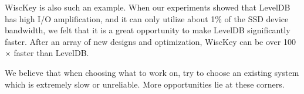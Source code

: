 WiscKey is also such an example. When our experiments showed that LevelDB
has high I/O amplification, and it can only utilize about 1\% of the
SSD device bandwidth, we felt that it is a great opportunity to make
LevelDB significantly faster. After an array of new designs and
optimization, WiscKey can be over 100$\times$ faster than LevelDB.    

We believe that when choosing what to work on, try to choose an
existing system which is extremely slow or unreliable. More
opportunities lie at these corners.  



